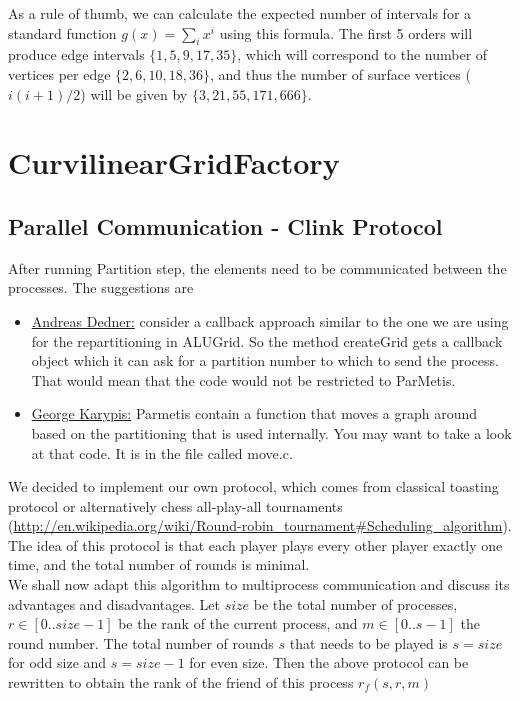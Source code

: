 \documentclass[12pt]{article}
\begin{document}
\noindent
As a rule of thumb, we can calculate the expected number of intervals for a standard function $g(x) = \sum_i x^i$ using this formula. The first 5 orders will produce edge intervals $\{ 1, 5, 9, 17, 35\}$, which will correspond to the number of vertices per edge $\{ 2, 6, 10, 18, 36\}$, and thus the number of surface vertices ($i(i+1)/2$) will be given by $\{3, 21, 55, 171, 666\}$.




\section{CurvilinearGridFactory}

\subsection{Parallel Communication - Clink Protocol}

After running Partition step, the elements need to be communicated between the processes. The suggestions are
\begin{itemize}
	\item \uline{Andreas Dedner:} consider a callback approach similar to the one we are using for the repartitioning in ALUGrid. So the method createGrid gets a callback object which it can ask for a partition number to which to send the process. That would mean that the code would not be restricted to ParMetis.
	\item \uline{George Karypis:} Parmetis contain a function that moves a graph around based on the partitioning that is used internally. You may want to take a look at that code. It is in the file called move.c.
\end{itemize}

\noindent
We decided to implement our own protocol, which comes from classical toasting protocol or alternatively chess all-play-all tournaments (\url{http://en.wikipedia.org/wiki/Round-robin_tournament#Scheduling_algorithm}). The idea of this protocol is that each player plays every other player exactly one time, and the total number of rounds is minimal. \\

\noindent
We shall now adapt this algorithm to multiprocess communication and discuss its advantages and disadvantages. Let $size$ be the total number of processes, $r \in [0..size-1]$ be the rank of the current process, and $m \in [0..s-1]$ the round number. The total number of rounds $s$ that needs to be played is $s = size$ for odd size and $s = size - 1$ for even size. Then the above protocol can be rewritten to obtain the rank of the friend of this process $r_f(s,r,m)$\\
\end{document}
